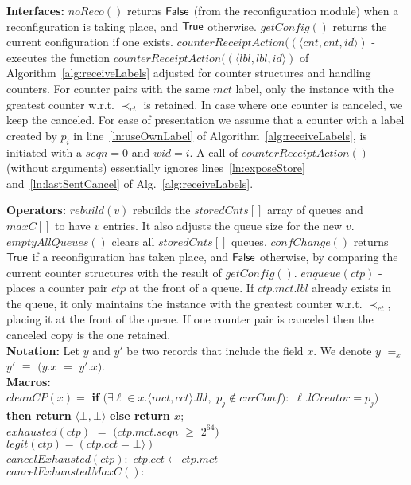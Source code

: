 \documentclass[11pt]{article}
\newcommand{\noReconfig}{noReco}
\begin{document}
\begin{algorithm}
\begin{footnotesize}
{\bf Interfaces:}
$\noReconfig()$ returns $\sf False$ (from the reconfiguration module) when a reconfiguration is taking place, and $\sf True$ otherwise.
$getConfig()$ returns the current configuration if one exists.
$counterReceiptAction((\langle cnt, cnt, id \rangle)$ - executes the function $counterReceiptAction((\langle lbl, lbl, id \rangle)$ of Algorithm~\ref{alg:receiveLabels} adjusted for counter structures and handling counters.
For counter pairs with the same $mct$ label, only the instance with the greatest counter w.r.t. $\prec_{ct}$ is retained. 
In case where one counter is canceled, we keep the canceled.
For ease of presentation we assume that a counter with a label created by $p_i$ in line~\ref{ln:useOwnLabel} of Algorithm~\ref{alg:receiveLabels}, is initiated with a $seqn = 0$ and $wid=i$. A call of $counterReceiptAction()$ (without arguments) essentially ignores lines~\ref{ln:exposeStore} and~\ref{ln:lastSentCancel} of Alg.~\ref{alg:receiveLabels}.

{\bf Operators:} 
$rebuild(v)$ rebuilds the $storedCnts[]$ array of queues and $maxC[]$ to have $v$ entries. It also adjusts the queue size for the new $v$.
$emptyAllQueues()$ clears all $storedCnts[]$ queues.
$confChange()$ returns $\sf True$ if a reconfiguration has taken place, and $\sf False$ otherwise, by comparing the current counter structures with the result of $getConfig()$.
$enqueue(ctp)$ - places a counter pair $ctp$ at the front of a queue. 
If $ctp.mct.lbl$ already exists in the queue, it only maintains the instance with the greatest counter w.r.t. $\prec_{ct}$, placing it at the front of the queue. 
If one counter pair is canceled then the canceled copy is the one retained. \label{CCT:operations}\\ 
{\bf Notation:} Let $y$ and $y'$ be two records that include the field $x$. We denote  $y$ $=_{x}$ $y'$ $\equiv$ $(y.x$ $=$ $y'.x)$.\\



{\bf Macros:}\\ $cleanCP(x) =$ {\bf if} $(\exists \ell \in x.\langle mct,cct \rangle.lbl,$ $p_j \not \in curConf):$ $\ell.lCreator = p_j)$ {\bf then return} $\langle \bot, \bot \rangle$ {\bf else return $x$}; \\
$exhausted(ctp)$ $=$ $(ctp.mct.seqn$ $\geq$ $2^{64})$~~~\\
	$legit(ctp)=(ctp.cct = \bot \rangle )$\\	
$cancelExhausted(ctp) :$ {$ctp.cct \gets ctp.mct$}\\  
	$cancelExhaustedMaxC() :$ 	  
	 \label{CCT:cancExh}





\end{footnotesize}
\end{algorithm}
\end{document}
